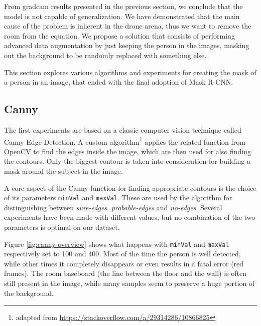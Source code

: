 From \gls{gradcam} results presented in the previous section, we conclude that the model is not capable of generalization. We have demonstrated that the main cause of the problem is inherent in the drone arena, thus we want to remove the room from the equation. We propose a solution that consists of performing advanced data augmentation by just keeping the person in the images, masking out the background to be randomly replaced with something else.

This section explores various algorithms and experiments for creating the mask of a person in an image, that ended with the final adoption of Mask R-CNN.



\subsection{Canny}
\label{subsec:masking-canny}

The first experiments are based on a classic computer vision technique called Canny Edge Detection. A custom algorithm\footnote{adapted from \url{https://stackoverflow.com/a/29314286/10866825}} applies the related function from OpenCV\cite{opencv_canny} to find the edges inside the image, which are then used for also finding the contours. Only the biggest contour is taken into consideration for building a mask around the subject in the image.

\medskip

A core aspect of the Canny function for finding appropriate contours is the choice of its parameters \texttt{minVal} and \texttt{maxVal}. These are used by the algorithm for distinguishing between \textit{sure-edges}, \textit{probable-edges} and \textit{no-edges}. Several experiments have been made with different values, but no combination of the two parameters is optimal on our dataset.

Figure \ref{fig:canny-overview} shows what happens with \texttt{minVal} and \texttt{maxVal} respectively set to 100 and 400. Most of the time the person is well detected, while other times it completely disappears or even results in a fatal error (red frames). The room baseboard (the line between the floor and the wall) is often still present in the image, while many samples seem to preserve a huge portion of the background.

